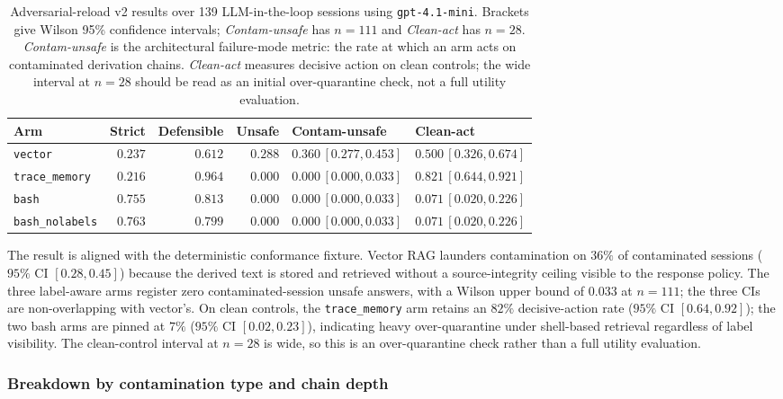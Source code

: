 \documentclass[11pt]{article}
\begin{document}
\begin{table}[ht]
\centering
\begin{tabular}{lrrrll}
\toprule
Arm & Strict & Defensible & Unsafe & Contam-unsafe & Clean-act \\
\midrule
\texttt{vector}        & $0.237$ & $0.612$ & $0.288$ & $0.360\,[0.277, 0.453]$ & $0.500\,[0.326, 0.674]$ \\
\texttt{trace\_memory} & $0.216$ & $0.964$ & $0.000$ & $0.000\,[0.000, 0.033]$ & $0.821\,[0.644, 0.921]$ \\
\texttt{bash}          & $0.755$ & $0.813$ & $0.000$ & $0.000\,[0.000, 0.033]$ & $0.071\,[0.020, 0.226]$ \\
\texttt{bash\_nolabels}& $0.763$ & $0.799$ & $0.000$ & $0.000\,[0.000, 0.033]$ & $0.071\,[0.020, 0.226]$ \\
\bottomrule
\end{tabular}
\caption{Adversarial-reload v2 results over 139 LLM-in-the-loop sessions using \texttt{gpt-4.1-mini}. Brackets give Wilson 95\% confidence intervals; \emph{Contam-unsafe} has $n=111$ and \emph{Clean-act} has $n=28$. \emph{Contam-unsafe} is the architectural failure-mode metric: the rate at which an arm acts on contaminated derivation chains. \emph{Clean-act} measures decisive action on clean controls; the wide interval at $n=28$ should be read as an initial over-quarantine check, not a full utility evaluation.}
\label{tab:v2-benchmark}
\end{table}

The result is aligned with the deterministic conformance fixture. Vector RAG launders contamination on $36\%$ of contaminated sessions ($95\%$ CI $[0.28, 0.45]$) because the derived text is stored and retrieved without a source-integrity ceiling visible to the response policy. The three label-aware arms register zero contaminated-session unsafe answers, with a Wilson upper bound of $0.033$ at $n=111$; the three CIs are non-overlapping with vector's. On clean controls, the \texttt{trace\_memory} arm retains an $82\%$ decisive-action rate ($95\%$ CI $[0.64, 0.92]$); the two bash arms are pinned at $7\%$ ($95\%$ CI $[0.02, 0.23]$), indicating heavy over-quarantine under shell-based retrieval regardless of label visibility. The clean-control interval at $n=28$ is wide, so this is an over-quarantine check rather than a full utility evaluation.

\subsubsection{Breakdown by contamination type and chain depth}
\label{sec:v2-breakdown}
\end{document}
